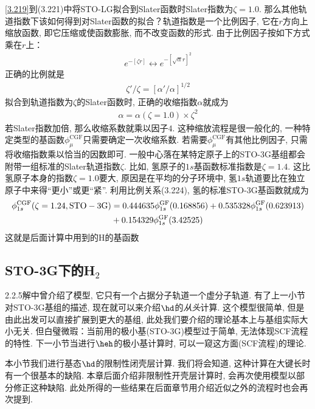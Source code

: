 \autoref{3.219}到(3.221)中将STO-LG拟合到Slater函数时Slater指数为$\zeta=1.0$. 
那么其他轨道指数下该如何得到对Slater函数的拟合？轨道指数是一个比例因子, 
它在$r$方向上缩放函数, 
即它压缩或使函数膨胀, 
而不改变函数的形式. 
由于比例因子按如下方式乘在$r$上：
\begin{align}
	e^{-[\zeta r]} \leftrightarrow e^{-[\sqrt{\alpha}r]^2}
\end{align}
正确的比例就是
\begin{align}
	\zeta'/\zeta=[\alpha'/\alpha]^{1/2}
\end{align}
拟合到轨道指数为$\zeta$的Slater函数时, 
正确的收缩指数$\alpha$就成为
\begin{align}
	\alpha = \alpha(\zeta=1.0)\times \zeta^2
\end{align}
若Slater指数加倍, 
那么收缩系数就乘以因子$4$. 
这种缩放流程是很一般化的, 
一种特定类型的基函数$\phi_\mu^\mathrm{CGF}$只需要确定一次收缩系数. 
若需要$\phi_\mu^\mathrm{CGF}$有其他比例因子, 
只需将收缩指数乘以恰当的因数即可. 
一般中心落在某特定原子上的STO-3G基组都会附带一组标准的Slater轨道指数$\zeta$. 
比如, 
氢原子的$1s$基函数标准指数是$\zeta=1.4$. 
这比氢原子本身的指数$\zeta=1.0$要大, 
原因是在平均的分子环境中, 
氢$1s$轨道要比在独立原子中来得``更小”或更``紧”. 
利用比例关系(3.224), 
氢的标准STO-3G基函数就成为
\begin{align}
	\label{3.225}
	\phi_{1s}^\mathrm{CGF}(\zeta=1.24,\mathrm{STO-3G}) & = 0.444635\phi_{1s}^\mathrm{GF}(0.168856) + 0.535328\phi_{1s}^\mathrm{GF}(0.623913) \notag\\
	& + 0.154329\phi_{1s}^\mathrm{GF}(3.42525)
\end{align}
这就是后面计算中用到的$\mathrm{H}$的基函数
\subsection{STO-3G下的H$_2$}
\label{sec:3.5.2}
2.2.5解中曾介绍了模型, 它只有一个占据分子轨道一个虚分子轨道. 
有了上一小节对STO-3G基组的描述, 现在就可以来介绍$\hd$的\emph{从头}\hft 计算. 
这个模型很简单, 但是由此出发可以直接扩展到更大的基组, 此处我们要介绍的\hft 理论基本上与基组实际大小无关. 
但白璧微瑕：当前用的极小基(STO-3G)模型过于简单, 无法体现SCF流程的特性. 
下一小节当进行$\heh$的极小基计算时, 可以一窥这方面(SCF流程)的\hft 理论.

本小节我们进行基态$\hd$的限制性闭壳层计算. 
我们将会知道, 
这种计算在大键长时有一个很基本的缺陷. 
本章后面介绍非限制性开壳层计算时, 
会再次使用模型以部分修正这种缺陷. 
此处所得的一些结果在后面章节用介绍\hft 近似之外的流程时也会再次提到.


